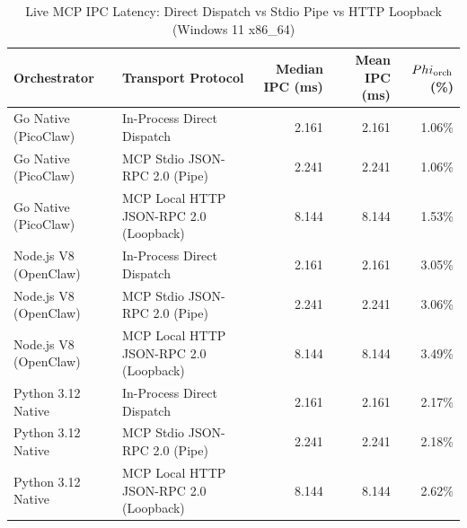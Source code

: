 \begin{table}[t]
\centering\small
\caption{Live MCP IPC Latency: Direct Dispatch vs Stdio Pipe vs HTTP Loopback (Windows 11 x86_64)}
\label{tab:Windows_mcp_transport}
\begin{tabular}{llrrr}
\toprule
Orchestrator & Transport Protocol & Median IPC (ms) & Mean IPC (ms) & $\\Phi_{\text{orch}}$ (\%) \\
\midrule
Go Native (PicoClaw) & In-Process Direct Dispatch & 2.161 & 2.161 & 1.06\% \\
Go Native (PicoClaw) & MCP Stdio JSON-RPC 2.0 (Pipe) & 2.241 & 2.241 & 1.06\% \\
Go Native (PicoClaw) & MCP Local HTTP JSON-RPC 2.0 (Loopback) & 8.144 & 8.144 & 1.53\% \\
Node.js V8 (OpenClaw) & In-Process Direct Dispatch & 2.161 & 2.161 & 3.05\% \\
Node.js V8 (OpenClaw) & MCP Stdio JSON-RPC 2.0 (Pipe) & 2.241 & 2.241 & 3.06\% \\
Node.js V8 (OpenClaw) & MCP Local HTTP JSON-RPC 2.0 (Loopback) & 8.144 & 8.144 & 3.49\% \\
Python 3.12 Native & In-Process Direct Dispatch & 2.161 & 2.161 & 2.17\% \\
Python 3.12 Native & MCP Stdio JSON-RPC 2.0 (Pipe) & 2.241 & 2.241 & 2.18\% \\
Python 3.12 Native & MCP Local HTTP JSON-RPC 2.0 (Loopback) & 8.144 & 8.144 & 2.62\% \\
\bottomrule
\end{tabular}
\end{table}
